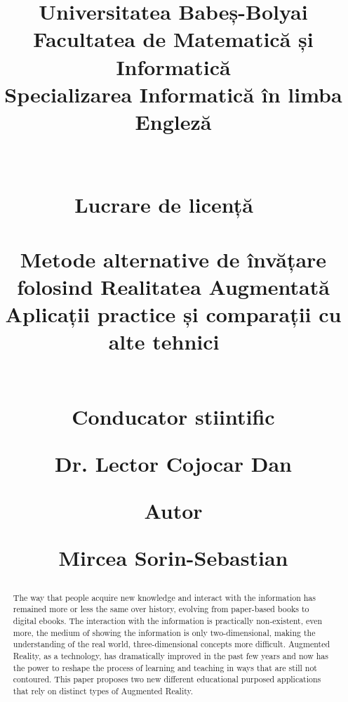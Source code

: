 \documentclass[12 pct]{report}
\begin{document}
\begin{titlepage}
\title{\vspace{-3.5cm}
  { \huge Universitatea Babeș-Bolyai\\
  Facultatea de Matematică și Informatică\\
  Specializarea Informatică în limba Engleză \\
  }
  \ \\
  \ \\
  {\huge \textbf{Lucrare de licență}}
  \ \\
  \ \\
  \textbf{
  Metode alternative de învățare folosind Realitatea Augmentată\\
  Aplicații practice și comparații cu alte tehnici
  }
  \ \\
  \ \\
   {%
    \begin{flushleft}%
  	 Conducator stiintific
  	\end{flushleft}
  	\begin{flushleft}%
  	 Dr. Lector Cojocar Dan
  	\end{flushleft}}
  {%
  \begin{flushright}
  	Autor
  \end{flushright}
  \begin{flushright}
  	Mircea Sorin-Sebastian
  \end{flushright} }
}%
\maketitle
\end{titlepage}

\begin{abstract}
The way that people acquire new knowledge and interact with the information has remained more or less the same over history, evolving from paper-based books to digital ebooks. 
The interaction with the information is practically non-existent, even more, the medium of showing the information is only two-dimensional, making the understanding of the real world, three-dimensional concepts more difficult. 
Augmented Reality, as a technology, has dramatically improved in the past few years and now has the power to reshape the process of learning and teaching in ways that are still not contoured. 
This paper proposes two new different educational purposed applications that rely on distinct types of Augmented Reality.
\end{abstract}
\end{document}
